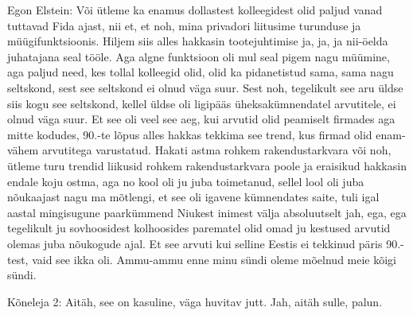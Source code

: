 Egon Elstein:
Või ütleme ka enamus dollastest kolleegidest olid paljud vanad tuttavad Fida ajast, nii et, et noh, mina privadori liitusime turunduse ja müügifunktsioonis. Hiljem siis alles hakkasin tootejuhtimise ja, ja, ja nii-öelda juhatajana seal tööle. Aga algne funktsioon oli mul seal pigem nagu müümine, aga paljud need, kes tollal kolleegid olid, olid ka pidanetistud sama, sama nagu seltskond, sest see seltskond ei olnud väga suur. Sest noh, tegelikult see aru üldse siis kogu see seltskond, kellel üldse oli ligipääs üheksakümnendatel arvutitele, ei olnud väga suur. Et see oli veel see aeg, kui arvutid olid peamiselt firmades aga mitte kodudes, 90.-te lõpus alles hakkas tekkima see trend, kus firmad olid enam-vähem arvutitega varustatud. Hakati astma rohkem rakendustarkvara või noh, ütleme turu trendid liikusid rohkem rakendustarkvara poole ja eraisikud hakkasin endale koju ostma, aga no kool oli ju juba toimetanud, sellel lool oli juba nõukaajast nagu ma mõtlengi, et see oli igavene kümnendates saite, tuli igal aastal mingisugune paarkümmend Niukest inimest välja absoluutselt jah, ega, ega tegelikult ju sovhoosidest kolhoosides parematel olid omad ju kestused arvutid olemas juba nõukogude ajal. Et see arvuti kui selline
Eestis ei tekkinud päris 90.-test, vaid see ikka oli. Ammu-ammu enne minu sündi oleme mõelnud meie kõigi sündi.
                 
Kõneleja 2:
Aitäh, see on kasuline, väga huvitav jutt.
Jah, aitäh sulle, palun.
